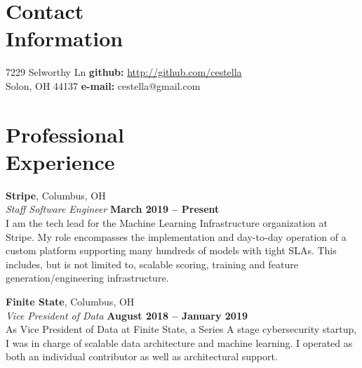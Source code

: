 \documentclass[margin,line,12pt]{resume}
\begin{document}
\begin{resume}
    \thispagestyle{empty}
    \section{\mysidestyle Contact\\Information}

    7229 Selworthy Ln \hfill {\bf github:} \url{http://github.com/cestella} \vspace{0mm}\\\vspace{0mm}%
    Solon, OH 44137 \hfill {\bf e-mail:} cestella@gmail.com       \vspace{0mm}\\\vspace{-4.5mm}%


    \section{\mysidestyle Professional\\Experience}
    \textbf{Stripe}, Columbus, OH\vspace{2mm}\\\vspace{1mm}%
    \textsl{Staff Software Engineer} \hfill \textbf{March 2019 -- Present}\\
    I am the tech lead for the Machine Learning Infrastructure organization at Stripe. My
    role encompasses the implementation and day-to-day operation of a custom platform
    supporting many hundreds of models with tight SLAs. This includes, but is not
    limited to, scalable scoring, training and feature generation/engineering infrastructure.

    \textbf{Finite State}, Columbus, OH\vspace{2mm}\\\vspace{1mm}%
    \textsl{Vice President of Data} \hfill \textbf{August 2018 -- January 2019}\\
    As Vice President of Data at Finite State, a Series A stage cybersecurity startup, I
    was in charge of scalable data architecture and machine learning.  I operated as both
    an individual contributor as well as architectural support.


\end{resume}
\end{document}
